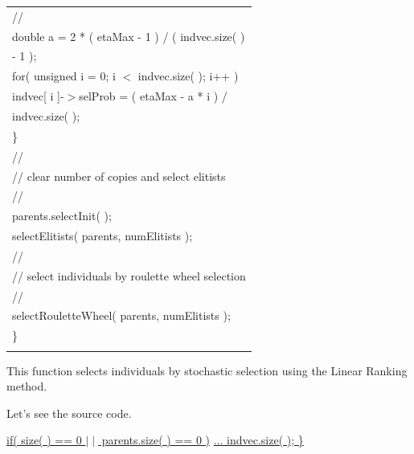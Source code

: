 \documentclass[twocolumn]{article}
\begin{document}
\begin{table}[h]
\begin{center}
{\begin{tabular}{|l|}
\hspace*{8mm} //\\
\hspace*{8mm} double a = 2 * ( etaMax - 1 ) / ( indvec.size( ) \\
\hspace*{12mm}  - 1 );\\
\hspace*{8mm} for( unsigned i = 0; i $<$ indvec.size( ); i++ )\\
\hspace*{12mm} indvec[ i ]-$>$selProb = ( etaMax - a * i ) / \\
\hspace*{16mm} indvec.size( );\\
\hspace*{4mm} \}\\
\hspace*{4mm} //\\
\hspace*{4mm} // clear number of copies and select elitists\\
\hspace*{4mm} //\\
\hspace*{4mm} parents.selectInit( );\\
\hspace*{4mm} selectElitists( parents, numElitists );\\
\hspace*{4mm} //\\
\hspace*{4mm} // select individuals by roulette wheel selection\\
\hspace*{4mm} //\\
\hspace*{4mm} selectRouletteWheel( parents, numElitists );\\
\}\\
\hspace*{7cm}\\\hline
\end{tabular}
}
\end{center}
\end{table}

\noindent
This function selects individuals by stochastic selection using
the Linear Ranking method. 

\noindent
Let's see the source code.

\vspace*{2mm}

\noindent
\underline{if( size( ) == 0 $\mid \mid$ parents.size( ) == 0 )}
\underline{... indvec.size( ); \}}
\end{document}
